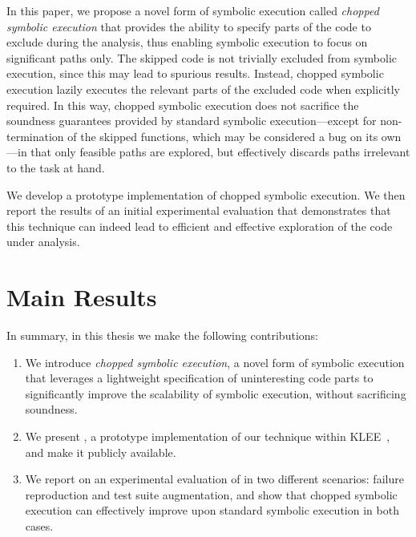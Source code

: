 In this paper, we propose a novel form of symbolic execution called
\emph{chopped symbolic execution} that provides the ability to specify
parts of the code to exclude during the analysis, thus enabling
symbolic execution to focus on significant paths only. The skipped
code is not trivially excluded from symbolic execution, since this may
lead to spurious results. Instead, chopped symbolic execution lazily
executes the relevant parts of the excluded code when explicitly
required. In this way, chopped symbolic execution does not sacrifice
the soundness guarantees provided by standard symbolic
execution---except for non-termination of the skipped functions, which
may be considered a bug on its own---in that only feasible paths are
explored, but effectively discards paths irrelevant to the task at
hand.

We develop a prototype implementation of chopped symbolic
execution. We then report the results of an initial experimental
evaluation that demonstrates that this technique can indeed lead to
efficient and effective exploration of the code under analysis.

\section{Main Results}
In summary, in this thesis we make the following contributions:
\begin{enumerate}[leftmargin=*]
\item We introduce \emph{chopped symbolic execution}, a novel form of
  symbolic execution that leverages a lightweight specification of
  uninteresting code parts to significantly improve the scalability of
  symbolic execution, without sacrificing soundness.

\item We present \toolname, a prototype implementation of our
  technique within KLEE~\cite{klee}, and make it publicly available.

\item We report on an experimental evaluation of \toolname in two
  different scenarios: failure reproduction and test suite
  augmentation, and show that chopped symbolic execution can
  effectively improve upon standard symbolic execution in both cases.
\end{enumerate}


